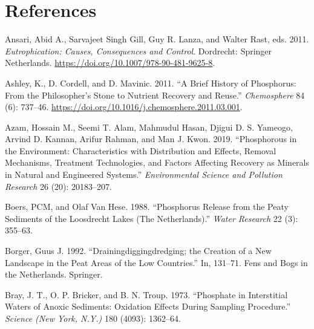 \documentclass[a4paper,11pt]{article}
\newenvironment{CSLReferences}%
  {}%
  {\par}
\begin{document}
\newpage

\hypertarget{references}{%
\section*{References}\label{references}}

\noindent

\setlength{\parindent}{-0.5cm}
\setlength{\leftskip}{0.5cm}
\setlength{\parskip}{8pt}

\hypertarget{refs}{}
\begin{CSLReferences}{1}{0}
\leavevmode\hypertarget{ref-ansariEutrophicationCausesConsequences2011}{}%
Ansari, Abid A., Sarvajeet Singh Gill, Guy R. Lanza, and Walter Rast, eds. 2011. \emph{Eutrophication: Causes, Consequences and Control}. {Dordrecht}: {Springer Netherlands}. \url{https://doi.org/10.1007/978-90-481-9625-8}.

\leavevmode\hypertarget{ref-ashleyBriefHistoryPhosphorus2011}{}%
Ashley, K., D. Cordell, and D. Mavinic. 2011. {``A Brief History of Phosphorus: {From} the Philosopher's Stone to Nutrient Recovery and Reuse.''} \emph{Chemosphere} 84 (6): 737--46. \url{https://doi.org/10.1016/j.chemosphere.2011.03.001}.

\leavevmode\hypertarget{ref-azamPhosphorousEnvironmentCharacteristics2019}{}%
Azam, Hossain M., Seemi T. Alam, Mahmudul Hasan, Djigui D. S. Yameogo, Arvind D. Kannan, Arifur Rahman, and Man J. Kwon. 2019. {``Phosphorous in the Environment: Characteristics with Distribution and Effects, Removal Mechanisms, Treatment Technologies, and Factors Affecting Recovery as Minerals in Natural and Engineered Systems.''} \emph{Environmental Science and Pollution Research} 26 (20): 20183--207.

\leavevmode\hypertarget{ref-boersPhosphorusReleasePeaty1988}{}%
Boers, PCM, and Olaf Van Hese. 1988. {``Phosphorus Release from the Peaty Sediments of the {Loosdrecht Lakes} ({The Netherlands}).''} \emph{Water Research} 22 (3): 355--63.

\leavevmode\hypertarget{ref-borgerDrainingDiggingDredging1992}{}%
Borger, Guus J. 1992. {``Draining{}digging{}dredging; the Creation of a New Landscape in the Peat Areas of the Low Countries.''} In, 131--71. Fens and Bogs in the {Netherlands}. {Springer}.

\leavevmode\hypertarget{ref-brayPhosphateInterstitialWaters1973}{}%
Bray, J. T., O. P. Bricker, and B. N. Troup. 1973. {``Phosphate in {Interstitial Waters} of {Anoxic Sediments}: {Oxidation Effects} During {Sampling Procedure}.''} \emph{Science (New York, N.Y.)} 180 (4093): 1362--64.


\end{CSLReferences}
\end{document}
